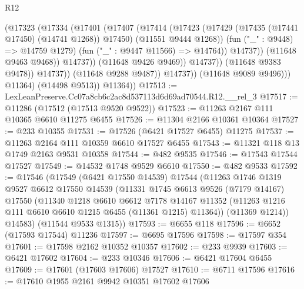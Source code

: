\begin{lexlean}{R12}
\begin{coremodule}
                                    (@17323
                                      (@17334
                                        (@17401
                                          (@17407
                                            (@17414
                                              (@17423
                                                (@17429
                                                  (@17435 (@17441 @17450) (@14741 @1268))
                                                  @17450)
                                                (@11551 @9444 @1268))
                                              (fun ("_" : @9448) => @14759 @1279)
                                              (fun ("_" : @9447 @11566) => @14764))
                                            @14737))
                                        (@11648 @9463 @9468))
                                      @14737))
                                  (@11648 @9426 @9469))
                                @14737))
                            (@11648 @9383 @9478))
                          @14737))
                      (@11648 @9288 @9487))
                    @14737))
                (@11648 @9089 @9496)))
            @11364)
          (@14498 @9513))
        @11364))
@17513 := LexLeanPreserve.Cc07a8cb6c2ac8d537113d6d69ad70544.R12.__rel_3
@17517 := @11286 (@17512 (@17513 @9520 @9522))
@17523 := @11263 @2167 @111 @10365 @6610 @11275 @6455
@17526 := @11304 @2166 @10361 @10364
@17527 := @233 @10355
@17531 := @17526 (@6421 @17527 @6455) @11275
@17537 := @11263 @2164 @111 @10359 @6610 @17527 @6455
@17543 := @11321 @118 @13 @1749 @2163 @9531 @10358
@17544 := @482 @9535
@17546 := @17543 @17544 @17527
@17549 := @14532 @1748 @9529 @6610
@17550 := @482 @9533
@17592 := @17546
    (@17549
      (@6421 @17550 @14539)
      @17544
      (@11263
        @1746
        @1319
        @9527
        @6612
        @17550
        @14539
        (@11331
          @1745
          @6613
          @9526
          (@7179 @14167)
          @17550
          (@11340
            @1218
            @6610
            @6612
            @7178
            @14167
            @11352
            (@11263 @1216 @111 @6610 @6610 @1215 @6455 (@11361 @1215) @11364))
          (@11369 @1214))
        @14583)
      (@11544 @9533 @1315))
@17593 := @6655 @118
@17596 := @6652 (@17593 @17544) @11236
@17597 := @6695 @17596
@17598 := @17597 @354
@17601 := @17598 @2162 @10352 @10357
@17602 := @233 @9939
@17603 := @6421 @17602
@17604 := @233 @10346
@17606 := @6421 @17604 @6455
@17609 := @17601 (@17603 @17606) @17527
@17610 := @6711 @17596
@17616 := @17610 @1955 @2161 @9942 @10351 @17602 @17606

\end{coremodule}
\end{lexlean}
